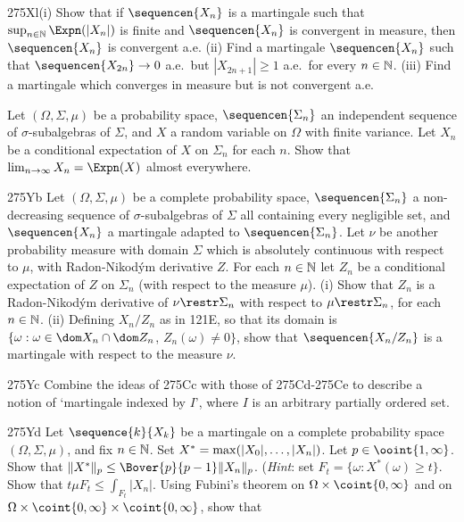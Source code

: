 {\spheader 275Xl(i) Show that if $\sequencen{X_n}$ is a martingale
such that $\sup_{n\in\Bbb N}\Expn(|X_n|)$ is finite and $\sequencen{X_n}$ is
convergent in measure, then $\sequencen{X_n}$ is convergent a.e.
(ii) Find a martingale $\sequencen{X_n}$ such that
$\sequencen{X_{2n}}\to 0$ a.e.\ but $|X_{2n+1}|\ge 1$ a.e.\ for every
$n\in\Bbb N$.   (iii) Find a martingale which converges in measure but is
not convergent a.e.   

%
 Let $(\Omega,\Sigma,\mu)$ be a probability space,
$\sequencen{\Sigma_n}$ an independent sequence of $\sigma$-subalgebras
of $\Sigma$, and $X$ a random variable on $\Omega$ with finite variance.
Let $X_n$ be a conditional expectation of $X$ on $\Sigma_n$ for each
$n$.   Show that $\lim_{n\to\infty}X_n=\Expn(X)$ almost everywhere.

\spheader 275Yb
Let $(\Omega,\Sigma,\mu)$ be a complete probability space,
$\sequencen{\Sigma_n}$ a non-decreasing sequence of
$\sigma$-subalgebras of $\Sigma$ all containing every negligible set,
and $\sequencen{X_n}$ a martingale adapted to $\sequencen{\Sigma_n}$.
Let $\nu$ be another probability measure with domain $\Sigma$ which is
absolutely continuous with respect to $\mu$, with Radon-Nikod\'ym
derivative $Z$.   For each $n\in\Bbb N$ let $Z_n$ be a conditional
expectation of $Z$ on $\Sigma_n$ (with respect to the measure $\mu$).
(i) Show that $Z_n$ is a Radon-Nikod\'ym derivative of
$\nu\restr\Sigma_n$ with respect to $\mu\restr\Sigma_n$, for each
$n\in\Bbb N$.   (ii) Defining $X_n/Z_n$ as in 121E, so that its domain is
$\{\omega:\omega\in\dom X_n\cap\dom Z_n$, $Z_n(\omega)\ne 0\}$,
show that $\sequencen{X_n/Z_n}$ is a martingale with respect to
the measure $\nu$.

\spheader 275Yc Combine the ideas of 275Cc with those of
275Cd-275Ce to describe a notion of `martingale indexed by $I$', where
$I$ is an arbitrary partially ordered set.

\spheader 275Yd
Let $\sequence{k}{X_k}$ be a martingale on a complete
probability space $(\Omega,\Sigma,\mu)$, and fix
$n\in\Bbb N$.   Set $X^*=\max(|X_0|,\ldots,\discretionary{}{}{}|X_n|)$.
Let $p\in\ooint{1,\infty}$.
Show that $\|X^*\|_p\le\Bover{p}{p-1}\|X_n\|_p$.   ({\it Hint\/}:  set
$F_t=\{\omega:X^*(\omega)\ge t\}$.   Show that
$t\mu F_t\le\int_{F_t}|X_n|$.   Using Fubini's
theorem on $\Omega\times\coint{0,\infty}$ and on
$\Omega\times\coint{0,\infty}\times\coint{0,\infty}$, show that

}
